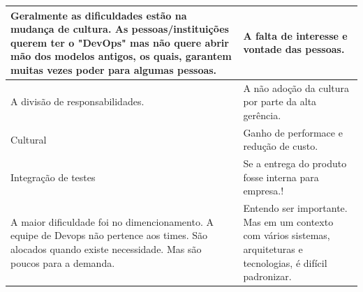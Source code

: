 \documentclass[twoside,english,brazilian]{UNISINOSartigo}
\begin{document}
\begin{table}[h]
\begin{tabularx}{\columnwidth}{XX}
       Geralmente   as dificuldades estão na mudança de cultura. As pessoas/instituições querem   ter o "DevOps" mas não quere abrir mão dos modelos antigos, os   quais, garantem muitas vezes poder para algumas pessoas.                                                                                                        &    A falta   de interesse e vontade das pessoas.                                                                                                            \\ \hline
       A   divisão de responsabilidades.                                                                                                                                                                                                                                                                                           &    A não   adoção da cultura por parte da alta gerência.                                                                                                    \\ \hline
       Cultural                                                                                                                                                                                                                                                                                                                    &    Ganho de   performace e redução de custo.                                                                                                                \\ \hline
       Integração   de testes                                                                                                                                                                                                                                                                                                      &    Se a   entrega do produto fosse interna para empresa.!                                                                                                   \\ \hline
       A maior   dificuldade foi no dimencionamento. A equipe de Devops não pertence aos   times. São alocados quando existe necessidade. Mas são poucos para a demanda.                                                                                                                                                           &    Entendo   ser importante. Mas em um contexto com vários sistemas, arquiteturas e   tecnologias, é difícil padronizar.                                    \\ \hline

\end{tabularx}
\end{table}
\end{document}
